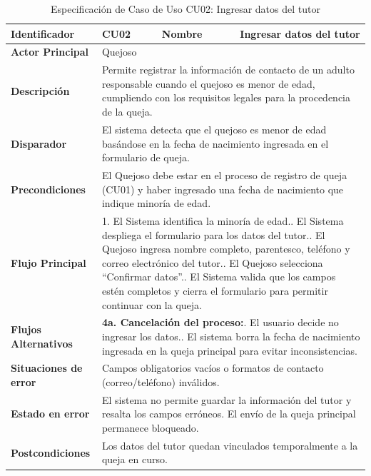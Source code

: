 \begin{longtable}{|p{3.5cm}|p{2cm}|p{2.5cm}|p{7cm}|}
\caption{Especificación de Caso de Uso CU02: Ingresar datos del tutor}
\label{tab:cu02_datos_tutor} \\
\hline
\textbf{Identificador} & CU02 & \textbf{Nombre} & Ingresar datos del tutor \\ \hline
\textbf{Actor Principal} & \multicolumn{3}{p{11.5cm}|}{Quejoso} \\ \hline
\textbf{Descripción} & \multicolumn{3}{p{11.5cm}|}{Permite registrar la información de contacto de un adulto responsable cuando el quejoso es menor de edad, cumpliendo con los requisitos legales para la procedencia de la queja.} \\ \hline
\textbf{Disparador} & \multicolumn{3}{p{11.5cm}|}{El sistema detecta que el quejoso es menor de edad basándose en la fecha de nacimiento ingresada en el formulario de queja.} \\ \hline
\textbf{Precondiciones} & \multicolumn{3}{p{11.5cm}|}{El Quejoso debe estar en el proceso de registro de queja (CU01) y haber ingresado una fecha de nacimiento que indique minoría de edad.} \\ \hline
\textbf{Flujo Principal} & \multicolumn{3}{p{11.5cm}|}{1. El Sistema identifica la minoría de edad.\newline 2. El Sistema despliega el formulario para los datos del tutor.\newline 3. El Quejoso ingresa nombre completo, parentesco, teléfono y correo electrónico del tutor.\newline 4. El Quejoso selecciona ``Confirmar datos''.\newline 5. El Sistema valida que los campos estén completos y cierra el formulario para permitir continuar con la queja.} \\ \hline
\textbf{Flujos Alternativos} & \multicolumn{3}{p{11.5cm}|}{\textbf{4a. Cancelación del proceso:}\newline 1. El usuario decide no ingresar los datos.\newline 2. El sistema borra la fecha de nacimiento ingresada en la queja principal para evitar inconsistencias.} \\ \hline
\textbf{Situaciones de error} & \multicolumn{3}{p{11.5cm}|}{Campos obligatorios vacíos o formatos de contacto (correo/teléfono) inválidos.} \\ \hline
\textbf{Estado en error} & \multicolumn{3}{p{11.5cm}|}{El sistema no permite guardar la información del tutor y resalta los campos erróneos. El envío de la queja principal permanece bloqueado.} \\ \hline
\textbf{Postcondiciones} & \multicolumn{3}{p{11.5cm}|}{Los datos del tutor quedan vinculados temporalmente a la queja en curso.} \\ \hline
\end{longtable}
\endgroup

